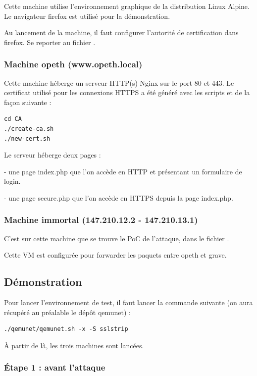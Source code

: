 Cette machine utilise l'environnement graphique de la distribution Linux Alpine. Le navigateur firefox est utilisé pour la démonstration.

Au lancement de la machine, il faut configurer l'autorité de certification dans firefox. Se reporter au fichier .

\subsubsection{Machine opeth (www.opeth.local)}

Cette machine héberge un serveur HTTP(s) Nginx sur le port 80 et 443. Le certificat utilisé pour les connexions HTTPS a été généré avec les scripts  et  de la façon suivante :

\begin{verbatim}
cd CA
./create-ca.sh
./new-cert.sh
\end{verbatim}

Le serveur héberge deux pages :

  - une page index.php que l'on accède en HTTP et présentant un formulaire de login.

  - une page secure.php que l'on accède en HTTPS depuis la page index.php.

\subsubsection{Machine immortal (147.210.12.2 - 147.210.13.1)}

C'est sur cette machine que se trouve le PoC de l'attaque, dans le fichier .

Cette VM est configurée pour forwarder les paquets entre opeth et grave.

\subsection{Démonstration}

Pour lancer l'environnement de test, il faut lancer la commande suivante (on aura récupéré au préalable le dépôt qemunet) :

\begin{verbatim}
./qemunet/qemunet.sh -x -S sslstrip
\end{verbatim}

À partir de là, les trois machines sont lancées.

\subsubsection{Étape 1 : avant l'attaque}

